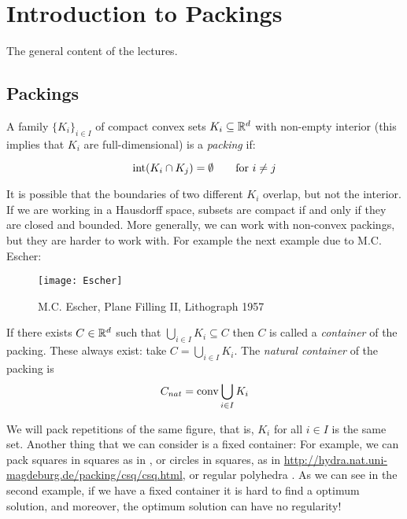 \chapter{Introduction to Packings}


The general content of the lectures.

\section{Packings}

\begin{defn}
 A family $\{K_i\}_{i\in I}$ of compact convex sets $K_i\subseteq\mathbb{R}^d$ with non-empty interior (this implies that $K_i$ are full-dimensional) is a \textit{packing} if:

$$\operatorname{int}(K_i\cap K_j)=\emptyset\qquad \text{for }i\neq j $$
\end{defn}

It is possible that the boundaries of two different $K_i$ overlap, but not the
interior. If we are working in a Hausdorff space, subsets are compact if and only if they
are closed and bounded. More generally, we can work with  non-convex packings, but they are
harder to work with. For example the next example due to M.C. Escher:
\begin{figure}[htbp]
  \centering
  \texttt{[image: Escher]}
  
  \caption{M.C. Escher, Plane Filling II, Lithograph 1957}
\label{fig:intro:1}
\end{figure}

\begin{defn}
  If there exists $C\in\mathbb{R}^d$ such that $\bigcup_{i\in I}K_i\subseteq C$
  then $C$ is called a \emph{container} of the packing. These always exist:  take $C=\bigcup_{i\in I}K_i$.
  The \emph{natural container} of the packing is
$$C_{nat}=\operatorname{conv} \displaystyle{\bigcup_{i\in I}K_i}$$
\end{defn}

We will pack repetitions of the same figure, that is, $K_i$ for all $i\in I$ is the same
set. Another thing that we can consider is a fixed container: For example, we can pack
squares in squares as in \cite{Friedman}, or circles in squares, as in
\url{http://hydra.nat.uni-magdeburg.de/packing/csq/csq.html}, or regular polyhedra
\cite{Jaoshvili}. As we can see in the second example, if we have a fixed container it is
hard to find a optimum solution, and moreover, the optimum solution can have no
regularity!

